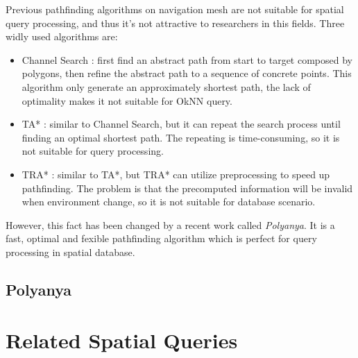 Previous pathfinding algorithms on navigation mesh are not suitable for spatial query
processing, and thus it's not attractive to researchers in this fields.
Three widly used algorithms are:
\begin{itemize}
\item Channel Search \cite{kallmann2005path}: first find an abstract path from start to target
    composed by polygons, then refine the abstract path to a sequence of concrete points. This
    algorithm only generate an approximately shortest path, the lack of optimality makes it not
    suitable for OkNN query.
  \item TA* \cite{demyen2006efficient}: similar to Channel Search, but it can repeat the search
    process until finding an optimal shortest path. The repeating is time-consuming, so it is not
    suitable for query processing.
  \item TRA* \cite{demyen2006efficient}: similar to TA*, but TRA* can utilize preprocessing to
    speed up pathfinding. The problem is that the precomputed information will be invalid when
    environment change, so it is not suitable for database scenario.
\end{itemize}

However, this fact has been changed by a recent work called
\textit{Polyanya}\cite{cuicompromise}. It is a fast, optimal and fexible pathfinding algorithm
which is perfect for query processing in spatial database.

\subsection{Polyanya}


\section{Related Spatial Queries}\label{lrquery}
